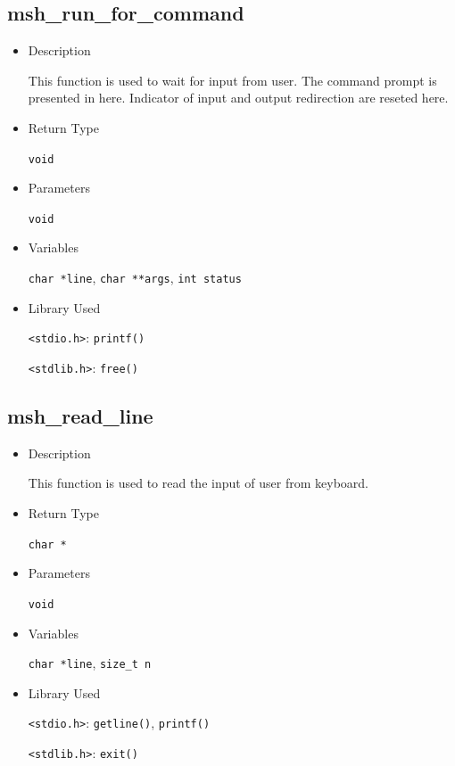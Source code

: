 \documentclass{article}
\begin{document}
\subsection{msh\_run\_for\_command}
\begin{itemize}
\item Description

This function is used to wait for input from user. The command prompt is presented in here. Indicator of input and output redirection are reseted here.

\item Return Type

\verb|void|

\item Parameters

\verb|void|

\item Variables

\verb|char *line|, \verb|char **args|, \verb|int status|

\item Library Used

\verb|<stdio.h>|: \verb|printf()|

\verb|<stdlib.h>|: \verb|free()|
\end{itemize}

\subsection{msh\_read\_line}
\begin{itemize}
\item Description

This function is used to read the input of user from keyboard.

\item Return Type

\verb|char *|

\item Parameters

\verb|void|

\item Variables

\verb|char *line|, \verb|size_t n|

\item Library Used

\verb|<stdio.h>|: \verb|getline()|, \verb|printf()|

\verb|<stdlib.h>|: \verb|exit()|
\end{itemize}
\end{document}

